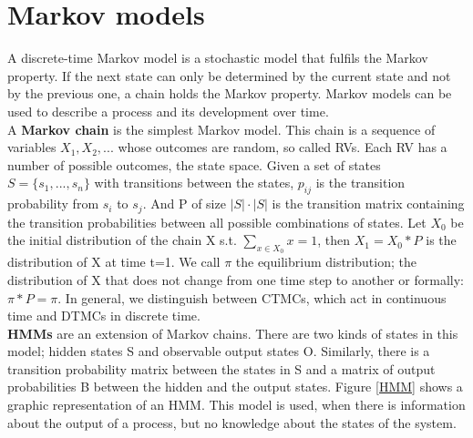 \section{Markov models} 
\label{section:MM}
A discrete-time Markov model is a stochastic model that fulfils the Markov property. If the next state can only be determined by the current state and not by the previous one, a chain holds the Markov property. Markov models can be used to describe a process and its development over time.\\

A \textbf{Markov chain} is the simplest Markov model. This chain is a sequence of variables $X_1, X_2, ...$ whose outcomes are random, so called \acp{RV}. Each \ac{RV} has a number of possible outcomes, the state space. Given a set of states $S = \{s_1, ..., s_n\}$ with transitions between the states, $p_{ij}$ is the transition probability from $s_i$ to $s_j$. And P of size $|S|\cdot|S|$ is the transition matrix containing the transition probabilities between all possible combinations of states.\newline
Let $X_0$ be the initial distribution of the chain X s.t. $\sum_{x \in X_0}{x} = 1$, then $X_1 = X_0 * P$ is the distribution of X at time t=1. We call $\pi$ the equilibrium distribution; the distribution of X that does not change from one time step to another or formally: $\pi * P = \pi$.\newline
In general, we distinguish between \acp{CTMC}, which act in continuous time and \acp{DTMC} in discrete time.\\
\textbf{\acp{HMM}} are an extension of Markov chains. There are two kinds of states in this model; hidden states S and observable output states O. Similarly, there is a transition probability matrix between the states in S and a matrix of output probabilities B between the hidden and the output states. Figure \ref{HMM} shows a graphic representation of an \ac{HMM}.\newline
This model is used, when there is information about the output of a process, but no knowledge about the states of the system.\\
